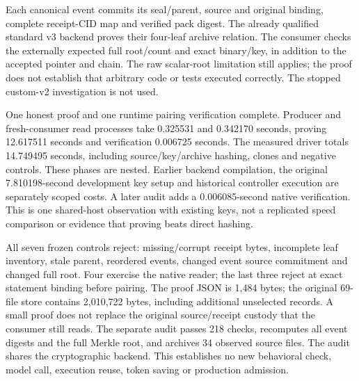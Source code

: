 Each canonical event commits its seal/parent, source and original binding,
complete receipt-CID map and verified pack digest. The already qualified
standard v3 backend proves their four-leaf archive relation. The consumer
checks the externally expected full root/count and exact binary/key, in addition
to the accepted pointer and chain. The raw scalar-root limitation still applies;
the proof does not establish that arbitrary code or tests executed correctly.
The stopped custom-v2 investigation is not used.

One honest proof and one runtime pairing verification complete. Producer and
fresh-consumer read processes take 0.325531 and 0.342170 seconds, proving
12.617511 seconds and verification 0.006725 seconds. The measured driver
totals 14.749495 seconds, including source/key/archive hashing, clones and
negative controls. These phases are nested. Earlier backend compilation, the
original 7.810198-second development key setup and historical controller
execution are separately scoped costs. A later audit adds a 0.006085-second
native verification. This is one shared-host observation with existing keys,
not a replicated speed comparison or evidence that proving beats direct hashing.

All seven frozen controls reject: missing/corrupt receipt bytes, incomplete
leaf inventory, stale parent, reordered events, changed event source commitment
and changed full root. Four exercise the native reader; the last three reject
at exact statement binding before pairing. The proof JSON is 1,484 bytes;
the original 69-file store contains 2,010,722 bytes, including additional
unselected records. A small proof does not replace the original source/receipt
custody that the consumer still reads. The separate audit passes 218 checks,
recomputes all event digests and the full Merkle root, and archives 34 observed
source files. The audit shares the cryptographic backend. This establishes
no new behavioral check, model call, execution reuse, token saving or
production admission.

